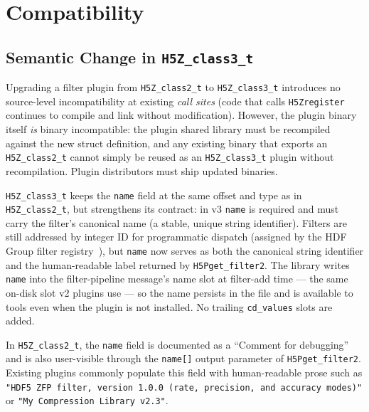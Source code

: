 \documentclass[../RFC-HDFG-2026-001.tex]{subfiles}
\begin{document}
\section{Compatibility}
\label{sec:compatibility}

\subsection{Semantic Change in \texttt{H5Z\_class3\_t}}
\label{sec:name-semantic-change}

Upgrading a filter plugin from \texttt{H5Z\_class2\_t} to \texttt{H5Z\_class3\_t}
introduces no source-level incompatibility at existing \emph{call sites}
(code that calls \texttt{H5Zregister} continues to compile and link without
modification). However, the plugin binary itself \emph{is} binary incompatible:
the plugin shared library must be recompiled against the new struct definition,
and any existing binary that exports an \texttt{H5Z\_class2\_t} cannot simply be
reused as an \texttt{H5Z\_class3\_t} plugin without recompilation. Plugin
distributors must ship updated binaries.

\texttt{H5Z\_class3\_t} keeps the \texttt{name} field at the same
offset and type as in \texttt{H5Z\_class2\_t}, but strengthens its
contract: in v3 \texttt{name} is required and must carry the filter's
canonical name (a stable, unique string identifier).  Filters are
still addressed by integer ID for programmatic dispatch (assigned by
the HDF Group filter registry~\cite{hdf5registeredfilters}), but
\texttt{name} now serves as both the canonical string identifier and
the human-readable label returned by \texttt{H5Pget\_filter2}.  The
library writes \texttt{name} into the filter-pipeline message's name
slot at filter-add time --- the same on-disk slot v2 plugins use ---
so the name persists in the file and is available to tools even when
the plugin is not installed.  No trailing \texttt{cd\_values} slots
are added.

In \texttt{H5Z\_class2\_t}, the \texttt{name} field is documented as a ``Comment for
debugging'' and is also user-visible through the \texttt{name[]} output parameter of
\texttt{H5Pget\_filter2}. Existing plugins commonly populate this field with
human-readable prose such as \texttt{"HDF5 ZFP filter, version 1.0.0 (rate,
precision, and accuracy modes)"} or \texttt{"My Compression Library v2.3"}.
\end{document}
